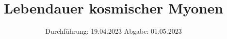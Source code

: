 

\subject{V01}
\title{Lebendauer kosmischer Myonen}
\date{%
  Durchführung: 19.04.2023
  \hspace{3em}
  Abgabe: 01.05.2023
}



\maketitle
\setcounter{page}{1}







\printbibliography{}


